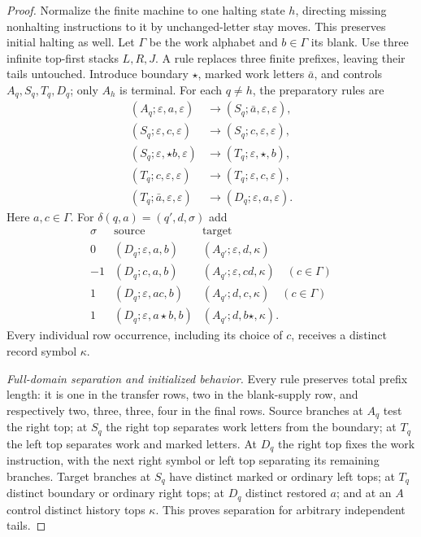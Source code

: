\begin{proof}
Normalize the finite machine to one halting state $h$, directing missing
nonhalting instructions to it by unchanged-letter stay moves. This preserves
initial halting as well. Let $\Gamma$ be the work alphabet and
$b\in\Gamma$ its blank. Use three infinite top-first stacks $L,R,J$.  A rule replaces three
finite prefixes, leaving their tails untouched.  Introduce boundary
$\star$, marked work letters $\bar a$, and controls $A_q,S_q,T_q,D_q$;
only $A_h$ is terminal.  For each $q\ne h$, the preparatory rules are
\begin{align}
 (A_q;\varepsilon,a,\varepsilon)&\to(S_q;\bar a,\varepsilon,\varepsilon),
 \label{eq:bb-balanced-entry}\\
 (S_q;\varepsilon,c,\varepsilon)&\to(S_q;c,\varepsilon,\varepsilon),
 \label{eq:bb-balanced-out-sweep}\\
 (S_q;\varepsilon,\star b,\varepsilon)&\to(T_q;\varepsilon,\star,b),
 \label{eq:bb-balanced-blank}\\
 (T_q;c,\varepsilon,\varepsilon)&\to(T_q;\varepsilon,c,\varepsilon),
 \label{eq:bb-balanced-return-sweep}\\
 (T_q;\bar a,\varepsilon,\varepsilon)&\to(D_q;\varepsilon,a,\varepsilon).
 \label{eq:bb-balanced-restore}
\end{align}
Here $a,c\in\Gamma$.  For $\delta(q,a)=(q',d,\sigma)$ add
\begin{equation}\label{eq:bb-balanced-step-table}
\begin{array}{c|c|c}
\sigma&\text{source}&\text{target}\\\hline
0&(D_q;\varepsilon,a,b)&(A_{q'};\varepsilon,d,\kappa)\\
-1&(D_q;c,a,b)&(A_{q'};\varepsilon,cd,\kappa)\quad(c\in\Gamma)\\
1&(D_q;\varepsilon,ac,b)&(A_{q'};d,c,\kappa)\quad(c\in\Gamma)\\
1&(D_q;\varepsilon,a\star b,b)&(A_{q'};d,b\star,\kappa).
\end{array}
\end{equation}
Every individual row occurrence, including its choice of $c$, receives
a distinct record symbol $\kappa$.

\emph{Full-domain separation and initialized behavior.}
\label{lem:bb-balanced-processor}\label{proof:bb-balanced-processor}
Every rule preserves total prefix length: it is one in the transfer
rows, two in the blank-supply row, and respectively two, three, three,
four in the final rows.  Source branches at $A_q$ test the right top;
at $S_q$ the right top separates work letters from the boundary;
at $T_q$ the left top separates work and marked letters.  At $D_q$
the right top fixes the work instruction, with the next right symbol
or left top separating its remaining branches.  Target branches at
$S_q$ have distinct marked or ordinary left tops; at $T_q$ distinct
boundary or ordinary right tops; at $D_q$ distinct restored $a$;
and at an $A$ control distinct history tops $\kappa$.
This proves separation for arbitrary independent tails.


\end{proof}
